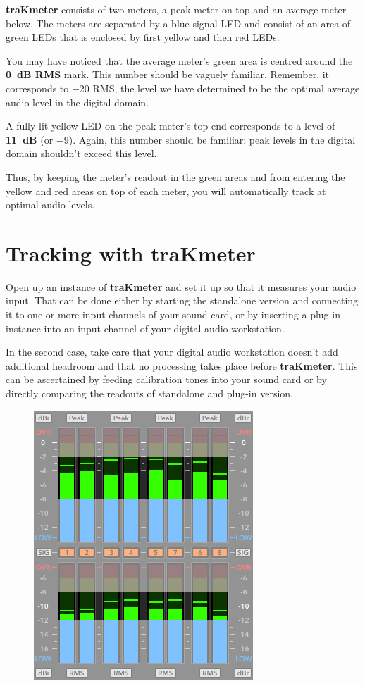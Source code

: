 \textbf{traKmeter} consists of two meters, a peak meter on top and an
average meter below.  The meters are separated by a blue signal LED
and consist of an area of green LEDs that is enclosed by first yellow
and then red LEDs.

You may have noticed that the average meter's green area is centred
around the \textbf{\SI{0}{\dB} RMS} mark.  This number should be
vaguely familiar.  Remember, it corresponds to \SI{-20}{\dBFS} RMS,
the level we have determined to be the optimal average audio level in
the digital domain.

A fully lit yellow LED on the peak meter's top end corresponds to a
level of \textbf{\SI[addsign=all]{+11}{\dB}} (or \SI{-9}{\dBFS}).
Again, this number should be familiar: peak levels in the digital
domain shouldn't exceed this level.

Thus, by keeping the meter's readout in the green areas and from
entering the yellow and red areas on top of each meter, you will
automatically track at optimal audio levels.

\section{Tracking with traKmeter}
\label{sec:tracking_with_trakmeter}

Open up an instance of \textbf{traKmeter} and set it up so that it
measures your audio input.  That can be done either by starting the
standalone version and connecting it to one or more input channels of
your sound card, or by inserting a plug-in instance into an input
channel of your digital audio workstation.

In the second case, take care that your digital audio workstation
doesn't add additional headroom and that no processing takes place
before \textbf{traKmeter}.  This can be ascertained by feeding
calibration tones into your sound card or by directly comparing the
readouts of standalone and plug-in version.

\begin{figure}
  \includegraphics[scale=0.45,clip]{include/images/trakmeter_optimal.png}
\end{figure}

